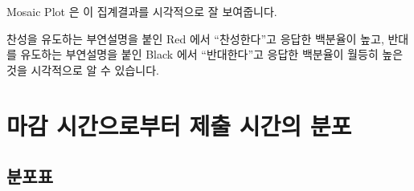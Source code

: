 \documentclass[
]{book}
\begin{document}
Mosaic Plot 은 이 집계결과를 시각적으로 잘 보여줍니다.

찬성을 유도하는 부연설명을 붙인 Red 에서 ``찬성한다''고 응답한 백분율이 높고, 반대를 유도하는 부연설명을 붙인 Black 에서 ``반대한다''고 응답한 백분율이 월등히 높은 것을 시각적으로 알 수 있습니다.

\section{마감 시간으로부터 제출 시간의 분포}\label{uxb9c8uxac10-uxc2dcuxac04uxc73cuxb85cuxbd80uxd130-uxc81cuxcd9c-uxc2dcuxac04uxc758-uxbd84uxd3ec-3}

\subsection{분포표}\label{uxbd84uxd3ecuxd45c-4}
\end{document}
